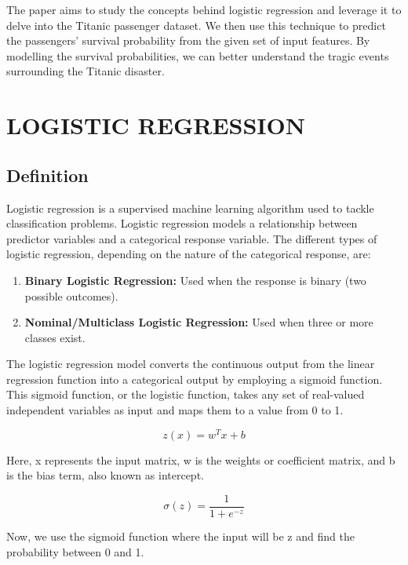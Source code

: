 \documentclass[conference]{IEEEtran}
\begin{document}
The paper aims to study the concepts behind logistic regression and leverage it to delve into the Titanic passenger dataset. We then use this technique to predict the passengers’ survival probability from the given set of input features. By modelling the survival probabilities, we can better understand the tragic events surrounding the Titanic disaster.

\vspace{2mm} %

\section{LOGISTIC REGRESSION}

\subsection{Definition}
Logistic regression is a supervised machine learning algorithm used to tackle classification problems. Logistic regression models a relationship between predictor variables and a categorical response variable. The different types of logistic regression, depending on the nature of the categorical response, are:

\begin{enumerate}
    \item \textbf{Binary Logistic Regression:} Used when the response is binary (two possible outcomes). 
    \item \textbf{Nominal/Multiclass Logistic Regression:} Used when three or more classes exist.
\end{enumerate}

The logistic regression model converts the continuous output from the linear regression function into a categorical output by employing a sigmoid function. This sigmoid function, or the logistic function, takes any set of real-valued independent variables as input and maps them to a value from 0 to 1.

\[ z(x) = w^Tx + b \]

Here, x represents the input matrix, w is the weights or coefficient matrix, and b is the bias term, also known as intercept.

\[ \sigma(z) = \frac{1}{1 + e^{-z}} \]

Now, we use the sigmoid function where the input will be z and find the probability between 0 and 1.
\end{document}
